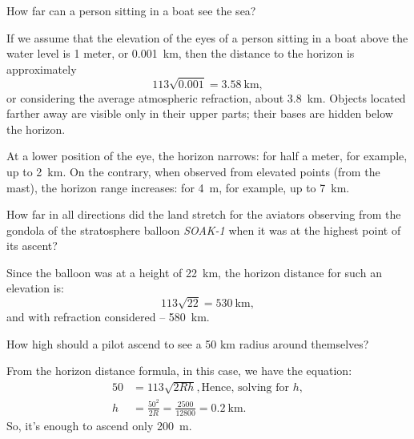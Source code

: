 \ques How far can a person sitting in a boat see the sea?

\ans If we assume that the elevation of the eyes of a person sitting in a boat above the water level is 1 meter, or \SI{0.001}{\kilo\meter}, then the distance to the horizon is approximately 
\begin{equation*}%
113 \sqrt{0.001} = \SI{3.58}{\kilo\meter},
\end{equation*} 
or considering the average atmospheric refraction, about \SI{3.8}{\kilo\meter}. Objects located farther away are visible only in their upper parts; their bases are hidden below the horizon.

At a lower position of the eye, the horizon narrows: for half a meter, for example, up to \SI{2}{\kilo\meter}. On the contrary, when observed from elevated points (from the mast), the horizon range increases: for \SI{4}{\meter}, for example, up to \SI{7}{\kilo\meter}.

\ques How far in all directions did the land stretch for the aviators observing from the gondola of the stratosphere balloon \emph{SOAK-1} when it was at the highest point of its ascent?

\ans Since the balloon was at a height of \SI{22}{\kilo\meter}, the horizon distance for such an elevation is:
\begin{equation*}%
113 \sqrt{22} = \SI{530}{\kilo\meter},
\end{equation*}
and with refraction considered -- \SI{580}{\kilo\meter}.

\ques How high should a pilot ascend to see a 50 km radius around themselves?

\ans From the horizon distance formula, in this case, we have the equation:
\begin{align*}%
50 & = 113 \sqrt{2Rh}, \text{Hence, solving for} \,\,h,\\
h & = \frac{50^{2}}{2R} = \frac{2500}{12800} = \SI{0.2}{\kilo\meter}.
\end{align*}
So, it's enough to ascend only \SI{200}{\meter}.

